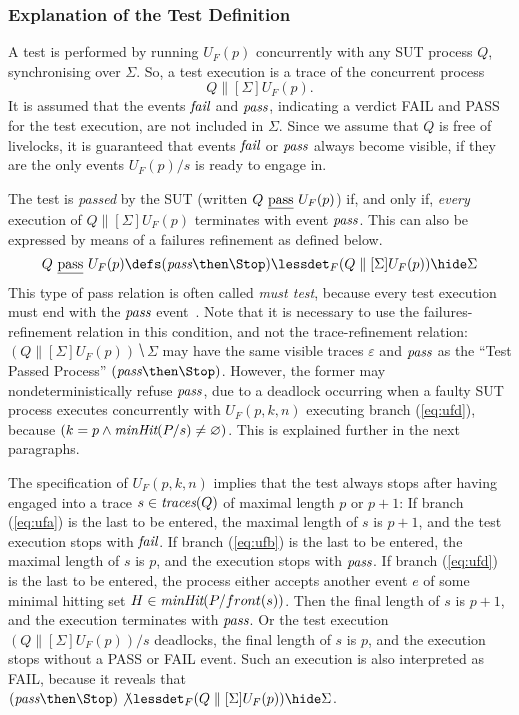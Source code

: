 \subsubsection*{Explanation of the Test Definition}
A test is performed by running $U_F(p)$ concurrently with any SUT process
$Q$, synchronising over $\Sigma$. So, a test execution is a trace of
the concurrent process
\[
Q\parallel[\Sigma] U_F(p).
\]
It is assumed that the events ${\text{\it fail}}$ and ${\text{\it pass}}$, indicating a verdict
FAIL and PASS for the test execution, are not included in $\Sigma$. Since we
assume that $Q$ is free of livelocks, it is guaranteed that events 
${\text{\it fail}}$ or ${\text{\it pass}}$ always become visible, if they are the only events
$U_F(p)/s$ is ready to engage in.


The test is
\emph{passed} by the SUT (written $Q\ \underline{\text{pass}}\ U_F(p)$) if, and only if, {\it
every} execution of $Q\parallel[\Sigma] U_F(p)$ terminates with   event
${\text{\it pass}}$. This can also be  expressed by means of a failures refinement as
defined below.
%
\begin{equation}
\label{eq:passF}
Q\ \pass\ U_F(p) \defs (\epass\then\Stop) \lessdet_F (Q\parallel[\Sigma] U_F(p)) \hide \Sigma
\end{equation}
%
This type of pass relation is often called \emph{must test}, because every
test execution must end with the ${\text{\it pass}}$
event~\cite{Hennessy:1988:ATP:50497}. Note that it is necessary to use the
failures-refinement relation in this condition, and not the trace-refinement
relation:~$(Q\parallel[\Sigma] U_F(p)) \hide \Sigma$ may have  the same
visible traces $\varepsilon$ and ${\text{\it pass}}$ as the ``Test Passed
Process'' $(\epass\then\Stop)$. However, the former may nondeterministically
refuse ${\text{\it pass}}$, due to a deadlock occurring when a faulty SUT process
executes concurrently with $U_F(p,k,n)$ executing branch (\ref{eq:ufd}),
because $(k = p\wedge \text{\it minHit}(P/s)\neq\varnothing)$. 
This is explained further in the next paragraphs.

The specification of $U_F(p,k,n)$ implies that the test always stops after having engaged into a trace $s\in\text{\it traces}(Q)$ of maximal length $p$ or $p+1$: 
If branch (\ref{eq:ufa})
is the last to be entered, the maximal length of $s$ is $p+1$, and the test execution
stops with ${\text{\it fail}}$. If branch (\ref{eq:ufb}) is the last to be entered, the maximal length of $s$ is $p$, and the execution stops with ${\text{\it pass}}$. If branch (\ref{eq:ufd})
is the last to be entered, the process either accepts another event
$e$ of some minimal hitting set $H\in\text{\it minHit}(P/front(s))$. Then the final length
of $s$ is $p+1$, and the execution terminates with ${\text{\it pass}}$. Or the test execution
$(Q\parallel[\Sigma] U_F(p))/s$ deadlocks,  the final length of $s$ is $p$,
and the execution stops without a PASS or FAIL event. Such an execution is also interpreted as FAIL, because it reveals that $(\epass\then\Stop) \not\lessdet_F (Q\parallel[\Sigma] U_F(p)) \hide \Sigma$.


